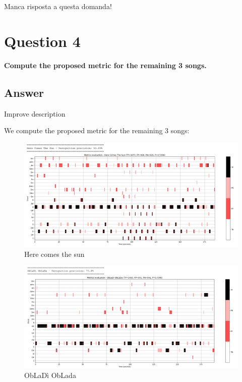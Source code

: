 \documentclass[
	12pt, %
]{fphw}
\begin{document}
\color{red}Manca risposta a questa domanda!\color{black}


\section*{\color{red}Question 4}

\begin{problem}
	\textbf{Compute the proposed metric for the remaining 3 songs.}
\end{problem}

\subsection*{\color{blue}Answer}

\color{red}Improve description\color{black}

We compute the proposed metric for the remaining 3 songs:

\begin{figure}[H]
 \centering
 \includegraphics[scale=1]{./images/4_here_comes_the_sun_metrics.png}
 \caption{Here comes the sun}
\end{figure}

\begin{figure}[H]
 \centering
 \includegraphics[scale=1]{./images/4_obladi_oblada_metrics.png}
 \caption{ObLaDì ObLada}
\end{figure}
\end{document}
